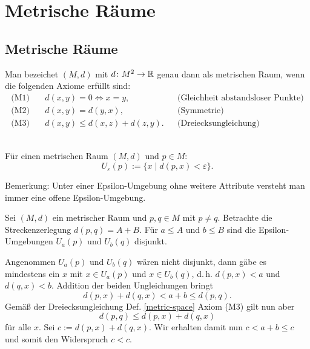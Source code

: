 \newpage
\section{Metrische Räume}
\subsection{Metrische Räume}
\begin{Definition}%
\label{metric-space}
Man bezeichet $(M,d)$ mit $d\colon M^2\to\mathbb R$ genau dann als
metrischen Raum, wenn die folgenden Axiome erfüllt sind:
\begin{align*}
\text{(M1)}\quad & d(x,y)=0\iff x=y, &&\text{(Gleichheit abstandsloser Punkte)}\\
\text{(M2)}\quad & d(x,y)=d(y,x), &&\text{(Symmetrie)}\\
\text{(M3)}\quad & d(x,y)\le d(x,z)+d(z,y). &&\text{(Dreiecksungleichung)}
\end{align*}
\end{Definition}

\begin{Definition}\mbox{}\\
Für einen metrischen Raum $(M,d)$ und $p\in M$:
\[U_\varepsilon(p) := \{x\mid d(p,x)<\varepsilon\}.\]
\end{Definition}
Bemerkung: Unter einer Epsilon-Umgebung ohne weitere Attribute
versteht man immer eine offene Epsilon-Umgebung.

\begin{Satz}%
\label{construction-disjoint-ep-balls}
Sei $(M,d)$ ein metrischer Raum und $p,q\in M$ mit $p\ne q$.
Betrachte die Streckenzerlegung $d(p,q)=A+B$. Für $a\le A$ und
$b\le B$ sind die Epsilon-Umgebungen $U_a(p)$ und $U_b(q)$ disjunkt.
\end{Satz}

\begin{Beweis}
Angenommen $U_a(p)$ und $U_b(q)$ wären nicht disjunkt, dann gäbe
es mindestens ein $x$ mit $x\in U_a(p)$ und $x\in U_b(q)$, d.\,h.
$d(p,x)<a$ und $d(q,x)<b$. Addition der beiden Ungleichungen
bringt
\[d(p,x)+d(q,x)<a+b\le d(p,q).\]
Gemäß der Dreiecksungleichung Def. \ref{metric-space} Axiom (M3) gilt
nun aber
\[d(p,q)\le d(p,x)+d(q,x)\]
für alle $x$. Sei $c:=d(p,x)+d(q,x)$. Wir erhalten damit nun
$c<a+b\le c$ und somit den Widerspruch $c<c$.\,\qedsymbol
\end{Beweis}

